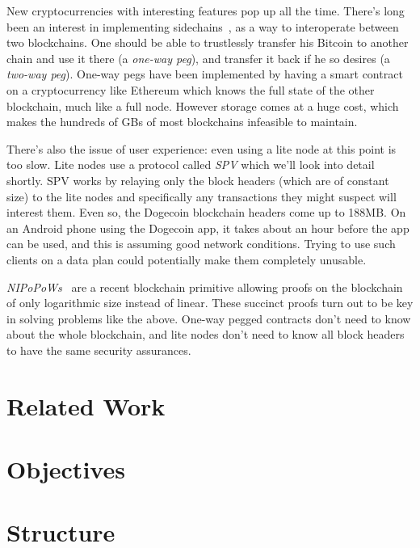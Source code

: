 New cryptocurrencies with interesting features pop up all the time. There's long been an interest in implementing sidechains~\cite{sidechains}, as a way to interoperate between two blockchains. One should be able to trustlessly transfer his Bitcoin to another chain and use it there (a \emph{one-way peg}), and transfer it back if he so desires (a \emph{two-way peg}). One-way pegs have been implemented by having a smart contract on a cryptocurrency like Ethereum which knows the full state of the other blockchain, much like a full node. However storage comes at a huge cost, which makes the hundreds of GBs of most blockchains infeasible to maintain.

There's also the issue of user experience: even using a lite node at this point is too slow. Lite nodes use a protocol called \emph{SPV} which we'll look into detail shortly. SPV works by relaying only the block headers (which are of constant size) to the lite nodes and specifically any transactions they might suspect will interest them. Even so, the Dogecoin blockchain headers come up to 188MB. On an Android phone using the Dogecoin app, it takes about an hour before the app can be used, and this is assuming good network conditions. Trying to use such clients on a data plan could potentially make them completely unusable.

\emph{NIPoPoWs}~\cite{nipopows} are a recent blockchain primitive allowing proofs on the blockchain of only logarithmic size instead of linear. These succinct proofs turn out to be key in solving problems like the above. One-way pegged contracts don't need to know about the whole blockchain, and lite nodes don't need to know all block headers to have the same security assurances.

\section{Related Work}
\section{Objectives}
\section{Structure}
